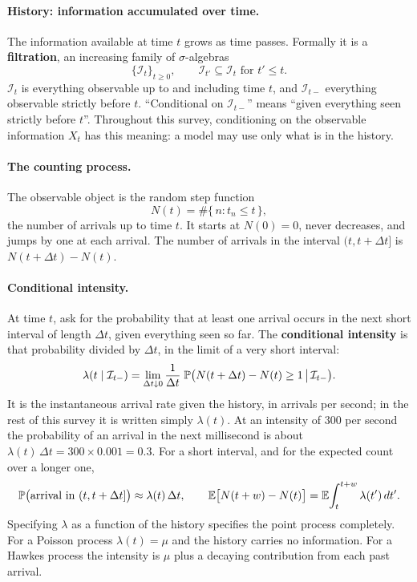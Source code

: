 \paragraph{History: information accumulated over time.} The information available at time $t$ grows as time passes. Formally it is a
\textbf{filtration}, an increasing family of $\sigma$-algebras
\[
  \{\mathcal{I}_t\}_{t \ge 0}, \qquad \mathcal{I}_{t'} \subseteq \mathcal{I}_t \text{ for } t' \le t.
\]
$\mathcal{I}_t$ is everything observable up to and including time $t$, and $\mathcal{I}_{t-}$
everything observable strictly before $t$. ``Conditional on $\mathcal{I}_{t-}$'' means ``given
everything seen strictly before $t$''. Throughout this survey, conditioning on the observable information $X_t$ has this meaning: a
model may use only what is in the history.

\paragraph{The counting process.} The observable object is the random step function
\[
  N(t) = \#\{\, n : t_n \le t \,\},
\]
the number of arrivals up to time $t$. It starts at $N(0) = 0$, never decreases, and jumps by one at
each arrival. The number of arrivals in the interval $(t, t + \Delta t]$ is $N(t + \Delta t) - N(t)$.

\paragraph{Conditional intensity.} At time $t$, ask for the probability that at least one arrival occurs in the next short interval of
length $\Delta t$, given everything seen so far. The \textbf{conditional intensity} is that
probability divided by $\Delta t$, in the limit of a very short interval:
\[
  \lambda(t \mid \mathcal{I}_{t-}) = \lim_{\Delta t \downarrow 0} \frac{1}{\Delta t}\;
  \P\big( N(t + \Delta t) - N(t) \ge 1 \,\big|\, \mathcal{I}_{t-} \big).
\]
It is the instantaneous arrival rate given the history, in arrivals per second; in the rest of this
survey it is written simply $\lambda(t)$. At an intensity of $300$ per second the probability of an
arrival in the next millisecond is about $\lambda(t)\,\Delta t = 300 \times 0.001 = 0.3$. For a short
interval, and for the expected count over a longer one,
\[
  \P\big(\text{arrival in } (t, t+\Delta t]\big) \approx \lambda(t)\, \Delta t, \qquad
  \E\big[N(t+w) - N(t)\big] = \E\!\int_{t}^{t+w} \lambda(t')\, dt'.
\]
Specifying $\lambda$ as a function of the history specifies the point process completely. For a
Poisson process $\lambda(t) = \mu$ and the history carries no information. For a Hawkes process the
intensity is $\mu$ plus a decaying contribution from each past arrival.

